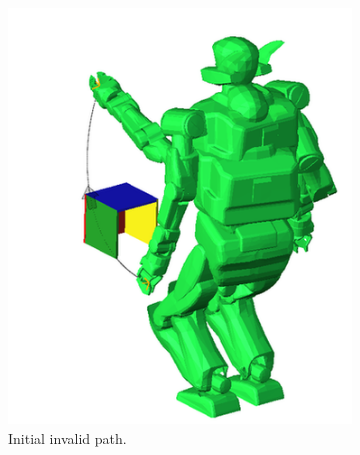 \begin{figure}
  \centering
  \begin{subfigure}{0.32\columnwidth}
    \centering
    \includegraphics[width = \columnwidth]
                    {src/chap3-optimal-motion-planning/figure/simple-path.png}
    \caption{Initial invalid path.}
    \label{simple-path}
  \end{subfigure}
  \begin{subfigure}{0.32\columnwidth}
    \centering

\end{subfigure}
\end{figure}
